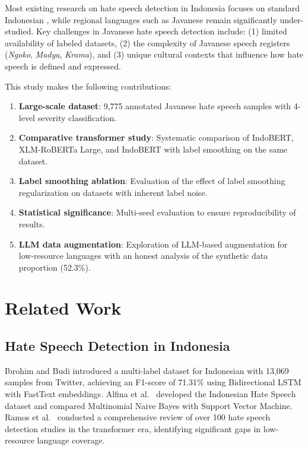 \documentclass[10pt,twocolumn]{article}
\begin{document}
Most existing research on hate speech detection in Indonesia focuses on standard Indonesian \cite{ibrohim2019,alfina2017}, while regional languages such as Javanese remain significantly under-studied. Key challenges in Javanese hate speech detection include: (1) limited availability of labeled datasets, (2) the complexity of Javanese speech registers (\textit{Ngoko}, \textit{Madya}, \textit{Krama}), and (3) unique cultural contexts that influence how hate speech is defined and expressed.

This study makes the following contributions:
\begin{enumerate}[leftmargin=*,nosep]
    \item \textbf{Large-scale dataset}: 9,775 annotated Javanese hate speech samples with 4-level severity classification.
    \item \textbf{Comparative transformer study}: Systematic comparison of IndoBERT, XLM-RoBERTa Large, and IndoBERT with label smoothing on the same dataset.
    \item \textbf{Label smoothing ablation}: Evaluation of the effect of label smoothing regularization on datasets with inherent label noise.
    \item \textbf{Statistical significance}: Multi-seed evaluation to ensure reproducibility of results.
    \item \textbf{LLM data augmentation}: Exploration of LLM-based augmentation for low-resource languages with an honest analysis of the synthetic data proportion (52.3\%).
\end{enumerate}

\section{Related Work}

\subsection{Hate Speech Detection in Indonesia}

Ibrohim and Budi \cite{ibrohim2019} introduced a multi-label dataset for Indonesian with 13,069 samples from Twitter, achieving an F1-score of 71.31\% using Bidirectional LSTM with FastText embeddings. Alfina et al.\ \cite{alfina2017} developed the Indonesian Hate Speech dataset and compared Multinomial Naive Bayes with Support Vector Machine. Ramos et al.\ \cite{ramos2024} conducted a comprehensive review of over 100 hate speech detection studies in the transformer era, identifying significant gaps in low-resource language coverage.
\end{document}
